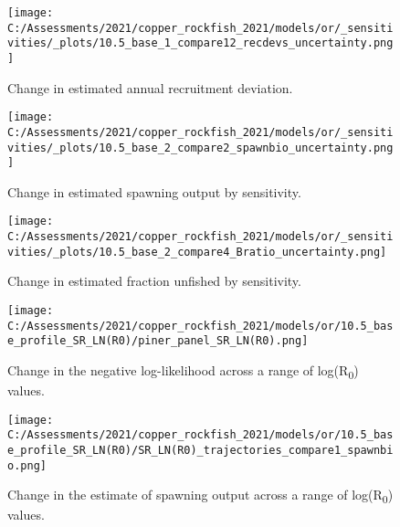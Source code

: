 \documentclass[11pt,
  english,
  a4paper,
]{article}
\begin{document}
\tagmcend\tagstructend


\begin{figure}
\centering
\texttt{[image: C:/Assessments/2021/copper\_rockfish\_2021/models/or/\_sensitivities/\_plots/10.5\_base\_1\_compare12\_recdevs\_uncertainty.png]}
\caption{Change in estimated annual recruitment deviation.\label{fig:sens-recdev-1}}
\end{figure}

\tagmcend\tagstructend


\begin{figure}
\centering
\texttt{[image: C:/Assessments/2021/copper\_rockfish\_2021/models/or/\_sensitivities/\_plots/10.5\_base\_2\_compare2\_spawnbio\_uncertainty.png]}
\caption{Change in estimated spawning output by sensitivity.\label{fig:sens-ssb-2}}
\end{figure}

\tagmcend\tagstructend


\begin{figure}
\centering
\texttt{[image: C:/Assessments/2021/copper\_rockfish\_2021/models/or/\_sensitivities/\_plots/10.5\_base\_2\_compare4\_Bratio\_uncertainty.png]}
\caption{Change in estimated fraction unfished by sensitivity.\label{fig:sens-depl-2}}
\end{figure}

\tagmcend\tagstructend


\begin{figure}
\centering
\texttt{[image: C:/Assessments/2021/copper\_rockfish\_2021/models/or/10.5\_base\_profile\_SR\_LN(R0)/piner\_panel\_SR\_LN(R0).png]}
\caption{Change in the negative log-likelihood across a range of log(R\textsubscript{0}) values.\label{fig:r0-profile}}
\end{figure}

\tagmcend\tagstructend


\begin{figure}
\centering
\texttt{[image: C:/Assessments/2021/copper\_rockfish\_2021/models/or/10.5\_base\_profile\_SR\_LN(R0)/SR\_LN(R0)\_trajectories\_compare1\_spawnbio.png]}
\caption{Change in the estimate of spawning output across a range of log(R\textsubscript{0}) values.\label{fig:r0-ssb}}
\end{figure}
\end{document}
